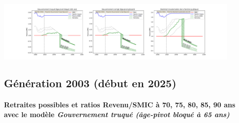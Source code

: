  \begin{center}\includegraphics[width=0.9\textwidth]{fig/BIATSS_1990_22_dest_retraite.pdf}\end{center} \label{fig/BIATSS_1990_22_dest_retraite.pdf} 

\newpage 
 
\subsection{Génération 2003 (début en 2025)} 

\paragraph{Retraites possibles et ratios Revenu/SMIC à 70, 75, 80, 85, 90 ans avec le modèle \emph{Gouvernement truqué (âge-pivot bloqué à 65 ans)}}  
 
